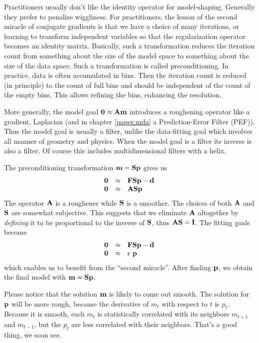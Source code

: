 \par
Practitioners usually don't like
the identity operator for model-shaping.
Generally they prefer to penalize wiggliness.
For practitioners,
the lesson of the second miracle of conjugate gradients
is that we have a choice of many iterations,
or learning to transform
independent variables so that
the regularization operator becomes an identity matrix.
Basically, such a transformation reduces the iteration count
from    something about the size of the model space
to      something about the size of the data space.
Such a transformation is called preconditioning.
In practice, data is often accumulated in bins.
Then the iteration count is reduced (in principle)
to the count of full bins
and should be independent of the count of the empty bins.
This allows refining the bins, enhancing the resolution.


\par
More generally,
the model goal $\bold 0 \approx \bold A \bold m$
introduces a roughening operator like a gradient,
Laplacian
(and in chapter \ref{paper:mda}
a Prediction-Error Filter (PEF)).
Thus the model goal is usually a filter,
unlike the data-fitting goal
which involves all manner of geometry and physics.
When the model goal is a filter its inverse is also a filter.
Of course this includes multidimensional filters with a helix.


\par
The preconditioning transformation
$\bold m = \bold S \bold p$
gives us
\begin{equation}
        \begin{array}{lll}
        \bold 0 &\approx & \bold F \bold S \bold p - \bold d \\
        \bold 0 &\approx & \bold A \bold S \bold p
        \label{eqn:invintprecond}
        \end{array}
\end{equation}
The operator $\bold A$ is a roughener while $\bold S$ is a smoother.
The choices of both $\bold A$ and $\bold S$ are somewhat subjective.
This suggests that we eliminate $\bold A$ altogether
by {\em  defining} it to be proportional to the inverse of $\bold S$,
thus $\bold A\bold S=\bold I$.
The fitting goals become
\begin{equation}
        \label{eqn:whitevar1}
        \begin{array}{lll}
        \bold 0 &\approx & \bold F  \bold S \bold p - \bold d \\
        \bold 0 &\approx & \epsilon\ \bold p
        \end{array}
\end{equation}
which enables us to benefit from the ``second miracle''.
After finding $\bold p$,
we obtain the final model with $\bold m = \bold S \bold p$.
\par
Please notice that the solution $\bold m$ is likely to come out smooth.
The solution for $\bold p$ will be more rough, because the
derivative of $m_t$ with respect to $t$ is $p_t$.
Because it is smooth, each $m_t$ is statistically correlated with its neighbors $m_{t+1}$ and $m_{t-1}$,
but the $p_t$ are less correlated with their neighbors.
That's a good thing, we soon see.


